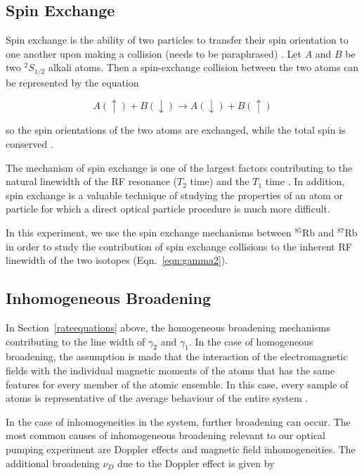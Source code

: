 \subsection{Spin Exchange}


Spin exchange is the ability of two particles to transfer their spin
orientation to one another upon making a collision (needs to be
paraphrased) \cite{bernheim}. Let $A$ and $B$ be two $^2S_{1/2}$
alkali atoms. Then a spin-exchange collision between the two atoms
can be represented by the equation

\begin{equation}
A(\uparrow) + B(\downarrow) \rightarrow A(\downarrow) + B(\uparrow)
\end{equation}

so the spin orientations of the two atoms are exchanged, while the
total spin is conserved \cite{happer}.  

The mechanism of spin exchange is one of the largest factors
contributing to the natural linewidth of the RF resonance ($T_2$ time) and
the $T_1$ time \cite{vanier}. In addition, spin exchange is a valuable
technique of studying the properties of an atom or particle for which
a direct optical particle procedure is much more difficult.

In this experiment, we use the spin exchange mechanisms between
$^{85}$Rb and $^{87}$Rb in order to study the contribution of spin
exchange collisions to the inherent RF linewidth of the two isotopes
(Eqn.~\ref{eqn:gamma2}).

\subsection{Inhomogeneous Broadening}

In Section~\ref{rateequations} above, the homogeneous broadening
mechanisms contributing to the line width of $\gamma_2$ and
$\gamma_1$. In the case of homogeneous broadening, the assumption is
made that the interaction of the electromagnetic fields with the
individual magnetic moments of the atoms that has the same features
for every member of the atomic ensemble. In this case, every sample of
atoms is representative of the average behaviour of the entire system
\cite{vanier}. 

In the case of inhomogeneities in the system, further broadening can
occur. The most common causes of inhomogeneous broadening relevant to
our optical pumping experiment are Doppler effects and magnetic field
inhomogeneities. The additional broadening $\nu_D$ due to the Doppler effect
is given by

